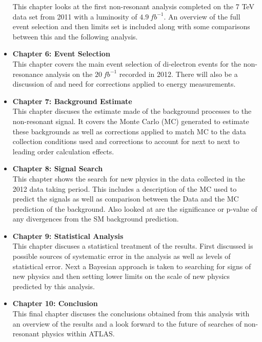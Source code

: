\begin{itemize}
{This chapter looks at the first non-resonant analysis completed on the 7 TeV data set from 2011 with a luminosity of $4.9~fb^{-1}$. An overview of the full event selection and then limits set is included along with some comparisons between this and the following analysis. 
}
\item{ 
{\bf Chapter 6: Event Selection} \\
This chapter covers the main event selection of di-electron events for the non-resonance analysis on the $20~fb^{-1}$ recorded in 2012. There will also be a discussion of and need for corrections applied to energy measurements.
}
\item{ 
{\bf Chapter 7: Background Estimate} \\
This chapter discuses the estimate made of the background processes to the non-resonant signal. It covers the Monte Carlo (MC) generated to estimate these backgrounds as well as corrections applied to match MC to the data collection conditions used and corrections to account for next to next to leading order calculation effects.
}
\item{ 
{\bf Chapter 8: Signal Search} \\
This chapter shows the search for new physics in the data collected in the 2012 data taking period. This includes a description of the MC used to predict the signals as well as comparison between the Data and the MC prediction of the background. Also looked at are the significance or p-value of any divergences from the SM background prediction.
}
\item{ 
{\bf Chapter 9: Statistical Analysis} \\
This chapter discuses a statistical treatment of the results. First discussed is possible sources of systematic error in the analysis as well as levels of statistical error. Next a Bayesian approach is taken to searching for signs of new physics and then setting lower limits on the scale of new physics predicted by this analysis.
}
\item{ 
{\bf Chapter 10: Conclusion} \\
This final chapter discuses the conclusions obtained from this analysis with an overview of the results and a look forward to the future of searches of non-resonant physics within ATLAS.
}
\end{itemize}






